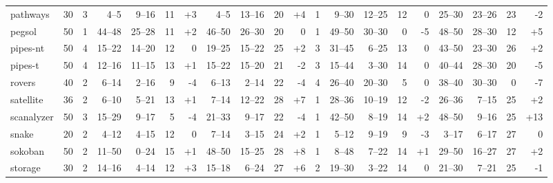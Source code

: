 \documentclass{article}
\begin{document}
\begin{table}[h]
\begin{tabular}{l@{}rr|rrrr|rrrr|r|rrrr|rrrr}
      pathways &     30 &   3 &     4--5 &   9--16 &  11 &  {\color{blue}+3} &     4--5 &  13--16 &  20 &   {\color{blue}+4} &   1 &     9--30 &  12--25 &  12 &                  0 &    25--30 &  23--26 &  23 &    {\color{red}-2} \\
        pegsol &     50 &   1 &   44--48 &  25--28 &  11 &  {\color{blue}+2} &   46--50 &  26--30 &  20 &                  0 &   1 &    49--50 &  30--30 &   0 &    {\color{red}-5} &    48--50 &  28--30 &  12 &   {\color{blue}+5} \\
      pipes-nt &     50 &   4 &   15--22 &  14--20 &  12 &                 0 &   19--25 &  15--22 &  25 &   {\color{blue}+2} &   3 &    31--45 &   6--25 &  13 &                  0 &    43--50 &  23--30 &  26 &   {\color{blue}+2} \\
       pipes-t &     50 &   4 &   12--16 &  11--15 &  13 &  {\color{blue}+1} &   15--22 &  15--20 &  21 &    {\color{red}-2} &   3 &    15--44 &   3--30 &  14 &                  0 &    40--44 &  28--30 &  20 &    {\color{red}-5} \\
        rovers &     40 &   2 &    6--14 &   2--16 &   9 &   {\color{red}-4} &    6--13 &   2--14 &  22 &    {\color{red}-4} &   4 &    26--40 &  20--30 &   5 &                  0 &    38--40 &  30--30 &   0 &    {\color{red}-7} \\
     satellite &     36 &   2 &    6--10 &   5--21 &  13 &  {\color{blue}+1} &    7--14 &  12--22 &  28 &   {\color{blue}+7} &   1 &    28--36 &  10--19 &  12 &    {\color{red}-2} &    26--36 &   7--15 &  25 &   {\color{blue}+2} \\
    scanalyzer &     50 &   3 &   15--29 &   9--17 &   5 &   {\color{red}-4} &   21--33 &   9--17 &  22 &    {\color{red}-4} &   1 &    42--50 &   8--19 &  14 &   {\color{blue}+2} &    48--50 &   9--16 &  25 &  {\color{blue}+13} \\
         snake &     20 &   2 &    4--12 &   4--15 &  12 &                 0 &    7--14 &   3--15 &  24 &   {\color{blue}+2} &   1 &     5--12 &   9--19 &   9 &    {\color{red}-3} &     3--17 &   6--17 &  27 &                  0 \\
       sokoban &     50 &   2 &   11--50 &   0--24 &  15 &  {\color{blue}+1} &   48--50 &  15--25 &  28 &   {\color{blue}+8} &   1 &     8--48 &   7--22 &  14 &   {\color{blue}+1} &    29--50 &  16--27 &  27 &   {\color{blue}+2} \\
       storage &     30 &   2 &   14--16 &   4--14 &  12 &  {\color{blue}+3} &   15--18 &   6--24 &  27 &   {\color{blue}+6} &   2 &    19--30 &   3--22 &  14 &                  0 &    21--30 &   7--21 &  25 &    {\color{red}-1} \\

\end{tabular}
\end{table}
\end{document}
